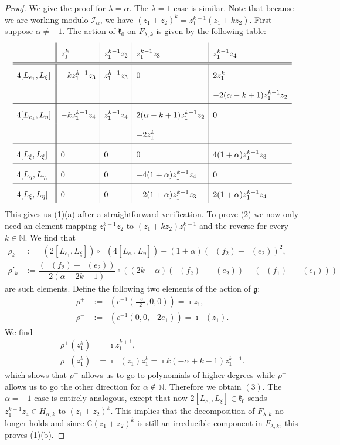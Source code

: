 \documentclass{amsart}
\numberwithin{theorem}{section}
\theoremstyle{definition}
\theoremstyle{remark}
\def\N{\mathds{N} }
\def\C{\mathds{C} }
\DeclareMathOperator{\bessel}{\mathcal B_\lambda}
\newcommand{\mf}[1]{\mathfrak{#1}}
\newcommand{\mc}[1]{\mathcal{#1}}
\DeclareMathOperator{\rol}{\rho_\lambda}
\newcommand{\Ial}{\mc I_\alpha}
\begin{document}
\begin{proof}
We give the proof for $\lambda=\alpha$. The $\lambda=1$ case is similar. Note that because we are working modulo $\Ial$, we have $({z_1} + {z_2})^k = z_1^{k-1}({z_1} + k{z_2})$. First suppose $\alpha\neq -1$. The action of $\mathfrak{k}_{0}$ on $F_{\lambda,k}$ is given by the following table:
\begin{align*}
\def\arraystretch{2}
\begin{array}{l||l|l|l|l}
 & z_1^k & z_1^{k-1}{z_2} & z_1^{k-1}{z_3} & z_1^{k-1}{z_4}\\ \hline\hline
4[L_{e_1},L_\xi]  & -k z_1^{k-1}{z_3} & z_1^{k-1}{z_3} & 0 & 2z_1^k \\
& & & & -2(\alpha-k+1)z_1^{k-1}{z_2}\\ \hline
4[L_{e_1},L_\eta]  & -k z_1^{k-1}{z_4} & z_1^{k-1}{z_4} & 2(\alpha-k+1)z_1^{k-1}{z_2} & 0\\
& & & -2z_1^k &\\ \hline
4[L_{{\xi}},L_{\xi}]  & 0 & 0 & 0 & 4(1+\alpha)z_1^{k-1}{z_3}\\ \hline
4[L_{{\eta}},L_{\eta}]  & 0 & 0 & -4(1+\alpha)z_1^{k-1}{z_4} & 0\\ \hline
4[L_{{\xi}},L_{\eta}]  & 0 & 0 & -2(1+\alpha)z_1^{k-1}{z_3} & 2(1+\alpha)z_1^{k-1}{z_4}
\end{array}
\end{align*}
This gives us (1)(a) after a straightforward verification. To prove (2) we now only need an element mapping $z_1^{k-1}{z_2}$ to $({z_1}+k{z_2})z_1^{k-1}$ and the reverse for every $k\in\N$. We find that
\begin{align*}
\rho_k &:= \rol(2[L_{e_1},L_\xi])\circ\rol(4[L_{e_1},L_\eta])-(1+\alpha)(\rol(f_2)- \rol(e_2))^2,\\
\rho'_k &:= \dfrac{(\rol(f_2)- \rol(e_2))}{2(\alpha-2k+1)}\circ((2k-\alpha)(\rol(f_2)- \rol(e_2))+ (\rol(f_1)- \rol(e_1)))
\end{align*}
are such elements. Define the following two elements of the action of $\mf g$:
\begin{align*}
\rho^+ &:= \rol(c^{-1}(\frac{-e_1}{2},0,0)) =\imath {z_1},\\
\rho^- &:= \rol(c^{-1}(0,0,-2e_1)) = \imath\bessel({z_1}).
\end{align*}
We find
\begin{align*}
\rho^+(z_1^k) &= \imath z_1^{k+1},\\
\rho^-(z_1^k) &= \imath\bessel({z_1}) z_1^k= \imath k(-\alpha+k-1)z_1^{k-1}.
\end{align*}
which shows that $\rho^+$ allows us to go to polynomials of higher degrees while $\rho^-$ allows us to go the other direction for $\alpha\not\in \N$. Therefore we obtain $(3)$. The $\alpha =-1$ case is entirely analogous, except that now $2[L_{e_1},L_{\xi}]\in \mf k_0$ sends $z_1^{k-1}z_4 \in H_{\alpha, k}$ to $(z_1+z_2)^k$. This implies that the decomposition of $F_{\lambda,k}$ no longer holds and since $\C ({z_1} + {z_2})^k$ is still an irreducible component in $F_{\lambda,k}$, this proves (1)(b).
\end{proof}
\end{document}
